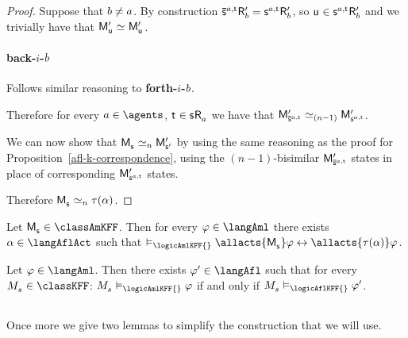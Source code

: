 \begin{proof}
Suppose that $b \neq a$.
By construction $\aPStateS[\agentA,\aStateT] \aAccessibility[\prime]{\agentB} = \aStateS[\agentA,\aStateT] \aAccessibility[\prime]{\agentB}$, so $\aStateU \in \aStateS[\agentA,\aStateT] \aAccessibility[\prime]{\agentB}$ and we trivially have that $\aPModel[\prime]{\aStateU} \bisimilar \aPModel[\prime]{\aStateU}$.

\paragraph{back-$i$-$b$} Follows similar reasoning to {\bf forth-$i$-$b$}.

Therefore for every $\agentA \in \agents$, $\aStateT \in \aStateS \aAccessibility{\agentA}$ we have that $\aPModel[\prime]{\aPStateS[\agentA,\aStateT]} \bisimilar[(n - 1)] \aPModel[\prime]{\aStateS[\agentA,\aStateT]}$.

We can now show that $\aPModel{\aStateS} \bisimilar[n] \aPModel[\prime]{\aStateS[\prime]}$ by using the same reasoning as the proof for Proposition~\ref{afl-k-correspondence}, using the $(n - 1)$-bisimilar $\aPModel[\prime]{\aPStateS[\agentA,\aStateT]}$ states in place of corresponding $\aPModel[\prime]{\aStateS[\agentA,\aStateT]}$ states.

Therefore $\aPModel{\aStateS} \bisimilar[n] \tau(\alpha)$.
\end{proof}

\begin{corollary}
Let $\aPModel{\aStateS} \in \classAmKFF$.
Then for every $\phi \in \langAml$ there exists $\alpha \in \langAflAct$ such that $\entails_\logicAmlKFF{} \allacts{\aPModel{\aStateS}} \phi \iff \allacts{\tau(\alpha)} \phi$.
\end{corollary}

\begin{corollary}
Let $\phi \in \langAml$. 
Then there exists $\phi' \in \langAfl$ such that for every $\kPModel{\kStateS} \in \classKFF$: $\kPModel{\kStateS} \entails_\logicAmlKFF{} \phi$ if and only if $\kPModel{\kStateS} \entails_\logicAflKFF{} \phi'$.
\end{corollary}

\subsection{\classS{}}

Once more we give two lemmas to simplify the construction that we will use.

